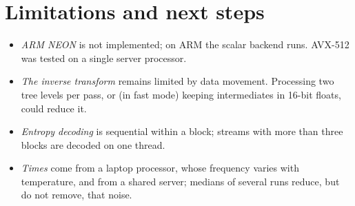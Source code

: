 \section{Limitations and next steps}
\label{sec:limitations}

\begin{itemize}
  \item \emph{ARM NEON} is not implemented; on ARM the scalar backend runs. AVX-512 was tested
    on a single server processor.
  \item \emph{The inverse transform} remains limited by data movement. Processing two tree levels
    per pass, or (in fast mode) keeping intermediates in 16-bit floats, could reduce it.
  \item \emph{Entropy decoding} is sequential within a block; streams with more than three blocks
    are decoded on one thread.
  \item \emph{Times} come from a laptop processor, whose frequency varies with temperature, and
    from a shared server; medians of several runs reduce, but do not remove, that noise.
\end{itemize}
